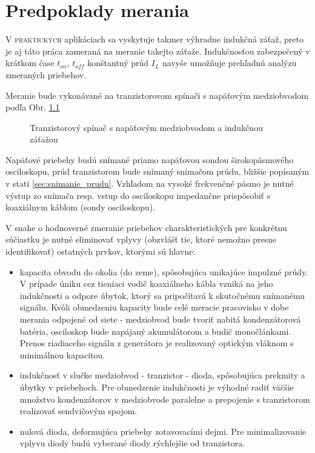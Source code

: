 \chapter{Predpoklady merania} \label{ch:meranie}



\lettrine{V}{ praktických} aplikáciach sa vyskytuje takmer výhradne indukčná záťaž, preto je aj táto práca zameraná na meranie takejto záťaže. Indukčnosťou zabezpečený v krátkom čase $t_{on}$, $t_{off}$ konštantný prúd $I_L$ navyše umožňuje prehľadnú analýzu zmeraných priebehov.

Meranie bude vykonávané na tranzistorovom spínači s napäťovým medziobvodom podľa Obr. \ref{fig:schema_zakladna}
\begin{figure}[!ht]
	\centering
	
	\caption{Tranzistorový spínač s napäťovým medziobvodom a indukčnou záťažou}
	\label{fig:schema_zakladna}
\end{figure}

Napäťové priebehy budú snímané priamo napäťovou sondou širokopásmového osciloskopu, prúd tranzistorom bude snímaný snímačom prúdu, bližšie popísaným v stati \ref{sec:snimanie_prudu}.
Vzhľadom na vysoké frekvenčné pásmo je nutné výstup zo snímača resp. vstup do osciloskopu impedančne prispôsobiť s koaxiálnym káblom (sondy osciloskopu). %

V snahe o hodnoverné zmeranie priebehov charakteristických pre konkrétnu súčiastku  je nutné eliminovať vplyvy (obzvlášť tie, ktoré nemožno presne identifikovať) ostatných prvkov, ktorými sú hlavne:
\begin{itemize}
	\item kapacita obvodu do okolia (do zeme), spôsobujúca unikajúce impulzné prúdy. V prípade úniku cez tieniaci vodič koaxiálneho kábla vzniká na jeho indukčnosti a odpore úbytok, ktorý sa pripočítavá k skutočnému snímanému signálu. Kvôli obmedzeniu kapacity bude celé meracie pracovisko v dobe merania odpojené od siete - medziobvod bude tvoriť nabitá kondenzátorová batéria, osciloskop bude napájaný akumulátorom a budič monočlánkami. Prenos riadiaceho signálu z generátora je realizovaný optickým vláknom s minimálnou kapacitou.
	\item indukčnosť v slučke medziobvod - tranzistor - dioda, spôsobujúca prekmity a úbytky v priebehoch. Pre obmedzenie indukčnosti je výhodné radiť väčšie množstvo kondenzátorov v medziobvode paralelne a prepojenie s tranzistorom realizovať sendvičovým spojom.
	\item nulová dioda, deformujúca priebehy zotavovacími dejmi. Pre minimalizovanie vplyvu diody budú vyberané diody rýchlejšie od tranzistora.
\end{itemize}


